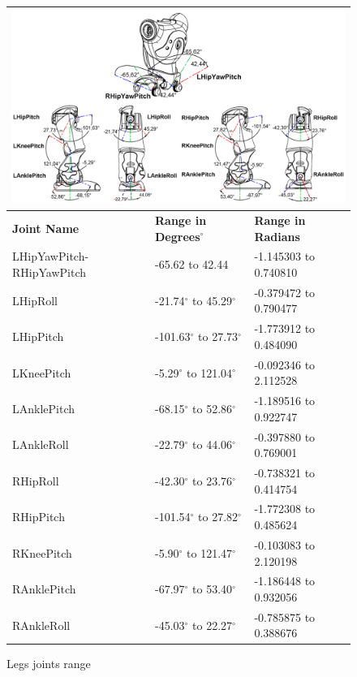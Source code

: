 \begin{figure}[t!]
\begin{tabular}{|p{5cm}|p{5cm}|p{5cm}|}
\multicolumn{3}{p{15cm}}{\centering \includegraphics[width = 15cm]{Figures/legsjoints.png}} \\ \hline
\textbf{Joint Name} & \textbf{Range in Degrees$^{\circ}$} & \textbf{Range in Radians} \\ \hline
LHipYawPitch-RHipYawPitch & -65.62 to 42.44 & -1.145303 to 0.740810 \\ \hline
LHipRoll & -21.74$^{\circ}$ to 45.29$^{\circ}$ & -0.379472 to 0.790477 \\ \hline
LHipPitch & -101.63$^{\circ}$ to 27.73$^{\circ}$ & -1.773912 to 0.484090 \\ \hline
LKneePitch & -5.29$^{\circ}$ to 121.04$^{\circ}$ & -0.092346 to 2.112528 \\ \hline
LAnklePitch & -68.15$^{\circ}$ to 52.86$^{\circ}$ & -1.189516 to 0.922747 \\ \hline
LAnkleRoll & -22.79$^{\circ}$ to 44.06$^{\circ}$ & -0.397880 to 0.769001 \\ \hline
RHipRoll & -42.30$^{\circ}$ to 23.76$^{\circ}$ & -0.738321 to 0.414754 \\ \hline
RHipPitch & -101.54$^{\circ}$ to 27.82$^{\circ}$ & -1.772308 to 0.485624 \\ \hline
RKneePitch & -5.90$^{\circ}$ to 121.47$^{\circ}$ & -0.103083 to 2.120198 \\ \hline
RAnklePitch & -67.97$^{\circ}$ to 53.40$^{\circ}$ & -1.186448 to 0.932056 \\ \hline
RAnkleRoll & -45.03$^{\circ}$ to 22.27$^{\circ}$ & -0.785875 to 0.388676 \\ \hline
\end{tabular}
\caption{Legs joints range}
\label{fig:ljoints}
\end{figure}

